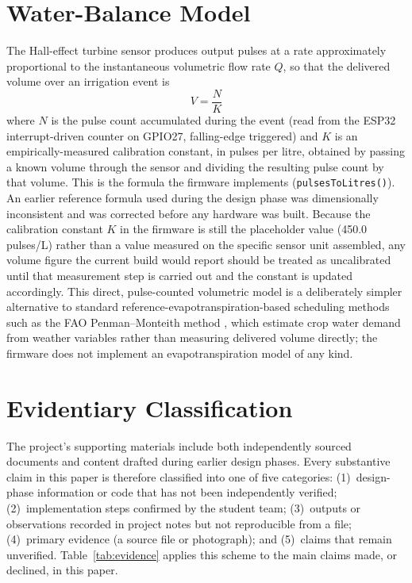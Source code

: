 \documentclass[conference]{IEEEtran}
\begin{document}
\section{Water-Balance Model}
\label{sec:model}

The Hall-effect turbine sensor produces output pulses at a rate
approximately proportional to the instantaneous volumetric flow rate
$Q$, so that the delivered volume over an irrigation event is
\begin{equation}
V = \frac{N}{K}
\label{eq:volume}
\end{equation}
where $N$ is the pulse count accumulated during the event (read from
the ESP32 interrupt-driven counter on GPIO27, falling-edge triggered)
and $K$ is an empirically-measured calibration constant, in pulses per
litre, obtained by passing a known volume through the sensor and
dividing the resulting pulse count by that volume. This is the formula
the firmware implements (\texttt{pulsesToLitres()}). An earlier reference
formula used during the design phase was dimensionally inconsistent and
was corrected before any hardware was built. Because the calibration
constant $K$ in the firmware is
still the placeholder value (450.0 pulses/L) rather than a value
measured on the specific sensor unit assembled, any volume figure the
current build would report should be treated as uncalibrated until that
measurement step is carried out and the constant is updated accordingly.
This direct, pulse-counted volumetric model is a deliberately simpler
alternative to standard reference-evapotranspiration-based scheduling
methods such as the FAO Penman--Monteith method \cite{allen1998fao56},
which estimate crop water demand from weather variables rather than
measuring delivered volume directly; the firmware does not implement an
evapotranspiration model of any kind.

\section{Evidentiary Classification}
\label{sec:evidence}

The project's supporting materials include both independently sourced
documents and content drafted during earlier design phases. Every
substantive claim in this paper is therefore classified into one of five
categories: (1)~design-phase information or code that has not been
independently verified; (2)~implementation steps confirmed by the student
team; (3)~outputs or observations recorded in project notes but not
reproducible from a file; (4)~primary evidence (a source file or
photograph); and (5)~claims that remain unverified. Table~\ref{tab:evidence}
applies this scheme to the main claims made, or declined, in this paper.
\end{document}
